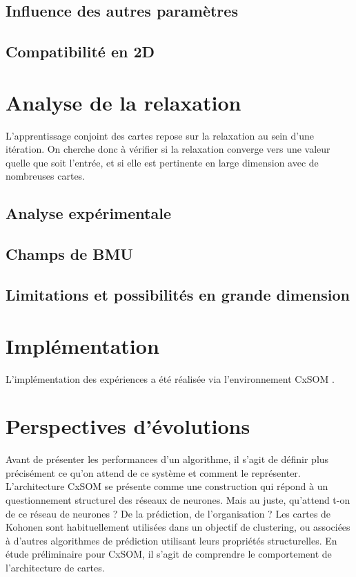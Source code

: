 \subsection{Influence des autres paramètres}

\subsection{Compatibilité en 2D}

\section{Analyse de la relaxation}

L'apprentissage conjoint des cartes repose sur la relaxation au sein d'une itération. On cherche donc à vérifier si la relaxation converge vers une valeur quelle que soit l'entrée, et si elle est pertinente en large dimension avec de nombreuses cartes.

\subsection{Analyse expérimentale}

\subsection{Champs de BMU}

\subsection{Limitations et possibilités en grande dimension}

\section{Implémentation}

L'implémentation des expériences a été réalisée via l'environnement CxSOM \cite{cxsom}.

\section{Perspectives d'évolutions}


Avant de présenter les performances d'un algorithme, il s'agit de définir plus précisément ce qu'on attend de ce système et comment le représenter. L'architecture CxSOM se présente comme une construction qui répond à un questionnement structurel des réseaux de neurones. Mais au juste, qu'attend t-on de ce réseau de neurones ? De la prédiction, de l'organisation ? Les cartes de Kohonen sont habituellement utilisées dans un objectif de clustering, ou associées à d'autres algorithmes de prédiction utilisant leurs propriétés structurelles. En étude préliminaire pour CxSOM, il s'agit de comprendre le comportement de l'architecture de cartes.

